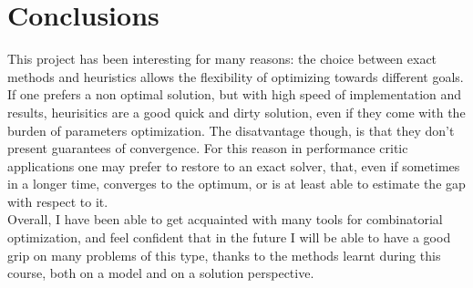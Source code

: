 \documentclass{article}
\begin{document}
\section{Conclusions}
This project has been interesting for many reasons: the choice between exact methods and heuristics allows the flexibility of optimizing towards different goals. If one prefers a non optimal solution, but with high speed of implementation and results, heurisitics are a good quick and dirty solution, even if they come with the burden of parameters optimization. The disatvantage though, is that they don't present guarantees of convergence. For this reason in performance critic applications one may prefer to restore to an exact solver, that, even if sometimes in a longer time, converges to the optimum, or is at least able to estimate the gap with respect to it. \\
Overall, I have been able to get acquainted with many tools for combinatorial optimization, and feel confident that in the future I will be able to have a good grip on many problems of this type, thanks to the methods learnt during this course, both on a model and on a solution perspective.




\newpage


\end{document}
